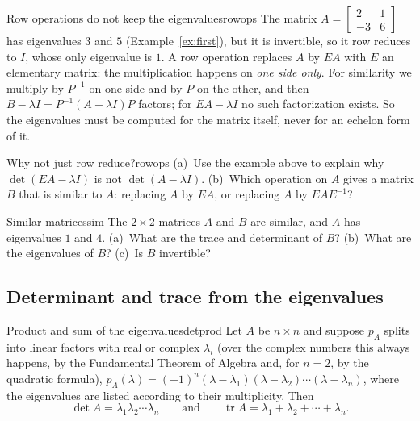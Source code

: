 \documentclass[11pt]{article}
\begin{document}
\begin{exmp}{Row operations do not keep the eigenvalues}{rowops}
The matrix $A=\begin{bmatrix}2&1\\-3&6\end{bmatrix}$ has eigenvalues $3$ and $5$ (Example~\ref{ex:first}), but it is invertible, so it row reduces to $I$, whose only eigenvalue is $1$. A row operation replaces $A$ by $EA$ with $E$ an elementary matrix: the multiplication happens on \emph{one side only}. For similarity we multiply by $P^{-1}$ on one side and by $P$ on the other, and then $B-\lambda I=P^{-1}(A-\lambda I)P$ factors; for $EA-\lambda I$ no such factorization exists. So the eigenvalues must be computed for the matrix itself, never for an echelon form of it.
\end{exmp}

\begin{think}{Why not just row reduce?}{rowops}
(a)~Use the example above to explain why $\det(EA-\lambda I)$ is not $\det(A-\lambda I)$. (b)~Which operation on $A$ gives a matrix $B$ that is similar to $A$: replacing $A$ by $EA$, or replacing $A$ by $EAE^{-1}$?
\end{think}

\begin{kc}{Similar matrices}{sim}
The $2\times2$ matrices $A$ and $B$ are similar, and $A$ has eigenvalues $1$ and $4$. (a)~What are the trace and determinant of $B$? (b)~What are the eigenvalues of $B$? (c)~Is $B$ invertible?
\end{kc}

\subsection*{Determinant and trace from the eigenvalues}

\begin{thm}{Product and sum of the eigenvalues}{detprod}
Let $A$ be $n\times n$ and suppose $p_A$ splits into linear factors with real or complex $\lambda_i$ (over the complex numbers this always happens, by the Fundamental Theorem of Algebra and, for $n=2$, by the quadratic formula), $p_A(\lambda)=(-1)^n(\lambda-\lambda_1)(\lambda-\lambda_2)\cdots(\lambda-\lambda_n)$, where the eigenvalues are listed according to their multiplicity. Then
\[
\det A=\lambda_1\lambda_2\cdots\lambda_n\qquad\text{and}\qquad\operatorname{tr}A=\lambda_1+\lambda_2+\cdots+\lambda_n.
\]
\end{thm}
\end{document}
